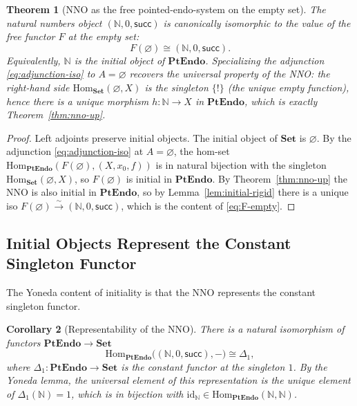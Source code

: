 \documentclass[12pt]{article}
\newtheorem{theorem}{Theorem}[section]
\newtheorem{corollary}[theorem]{Corollary}
\theoremstyle{definition}
\theoremstyle{remark}
\newcommand{\N}{\mathbb{N}}
\newcommand{\Set}{\mathbf{Set}}
\newcommand{\id}{\mathrm{id}}
\newcommand{\Hom}{\mathrm{Hom}}
\newcommand{\suc}{\mathsf{succ}}
\newcommand{\PtEndo}{\mathbf{PtEndo}}
\begin{document}
\begin{theorem}[NNO as the free pointed-endo-system on the empty set]
\label{thm:nno-yoneda}
The natural numbers object $(\N, 0, \suc)$ is canonically isomorphic to the value of the free functor $F$ at the empty set:
\begin{equation}
F(\varnothing) \cong (\N, 0, \suc).
\label{eq:F-empty}
\end{equation}
Equivalently, $\N$ is the initial object of $\PtEndo$. Specializing the adjunction \eqref{eq:adjunction-iso} to $A = \varnothing$ recovers the universal property of the NNO: the right-hand side $\Hom_{\Set}(\varnothing, X)$ is the singleton $\{!\}$ (the unique empty function), hence there is a unique morphism $h \colon \N \to X$ in $\PtEndo$, which is exactly Theorem~\ref{thm:nno-up}.
\end{theorem}

\begin{proof}
Left adjoints preserve initial objects. The initial object of $\Set$ is $\varnothing$. By the adjunction \eqref{eq:adjunction-iso} at $A = \varnothing$, the hom-set $\Hom_{\PtEndo}(F(\varnothing), (X, x_0, f))$ is in natural bijection with the singleton $\Hom_{\Set}(\varnothing, X)$, so $F(\varnothing)$ is initial in $\PtEndo$. By Theorem~\ref{thm:nno-up} the NNO is also initial in $\PtEndo$, so by Lemma~\ref{lem:initial-rigid} there is a unique iso $F(\varnothing) \xrightarrow{\sim} (\N, 0, \suc)$, which is the content of \eqref{eq:F-empty}.
\end{proof}

\subsection{Initial Objects Represent the Constant Singleton Functor}

The Yoneda content of initiality is that the NNO represents the constant singleton functor.

\begin{corollary}[Representability of the NNO]
\label{cor:nno-representable}
There is a natural isomorphism of functors $\PtEndo \to \Set$
\begin{equation}
\Hom_{\PtEndo}\bigl((\N, 0, \suc), -\bigr) \cong \Delta_1,
\label{eq:nno-rep}
\end{equation}
where $\Delta_1 \colon \PtEndo \to \Set$ is the constant functor at the singleton $1$. By the Yoneda lemma, the universal element of this representation is the unique element of $\Delta_1(\N) = 1$, which is in bijection with $\id_\N \in \Hom_{\PtEndo}(\N, \N)$.
\end{corollary}
\end{document}
